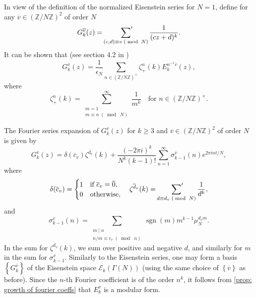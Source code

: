 \documentclass[10pt,leqno,twoside]{article}
\theoremstyle{plain}
\theoremstyle{definition}
\numberwithin{equation}{section}
\numberwithin{lem}{section}
\newcommand{\cbr}[1]{\left\{#1\right\}}
\newcommand{\smod}[1]{\;(\bmod\; #1)}
\DeclareMathOperator{\sgn}{sgn}
\begin{document}
In view of the definition of the normalized Eisenstein series for $N = 1$, define for any $\overline v\in (\mathbb Z/N\mathbb Z)^2$ of order $N$
\[G_k^{\overline v}(z) = \sideset{}{^\prime}\sum_{(c,d)\equiv v\smod N}\frac{1}{(cz+d)^k}.\] It can be shown that (see section 4.2 in \cite{diamond})
\[G_k^{\overline v}(z) = \frac{1}{\epsilon_N}\sum_{n\in(\mathbb Z/N\mathbb Z)^\times}\zeta_+^n(k)E_k^{n^{-1}\overline v}(z),\] where \[\zeta_+^n(k) = \sum_{\substack{m=1\\m\equiv n\smod N}}^\infty \frac{1}{m^k}\quad \text{for $n\in (\mathbb Z/N\mathbb Z)^\times$}.\] 

The Fourier series expansion of $G_k^{\overline v}(z)$ for $k\geq 3$ and $\overline v\in (\mathbb Z/N\mathbb Z)^2$ of order $N$ is given by \[G_k^{\overline v}(z) = \delta(\overline c_v)\zeta^{\overline d_v}(k) + \frac{(-2\pi i)^k}{N^k(k-1)!}\sum_{n=1}^\infty \sigma_{k-1}^{\overline v}(n)e^{2\pi i n t/N},\] where \[\delta(\overline c_v) = \begin{cases}
    1 & \text{if $\overline c_v =\overline 0$},\\
    0 & \text{otherwise},
\end{cases}\quad \zeta^{\overline d_v}(k) = \sideset{}{^\prime}\sum_{d\equiv d_v\smod N}\frac{1}{d^k},\] and 
\[\sigma_{k-1}^{\overline v}(n) = \sum_{\substack{m\mid n\\n/m \equiv c_v\smod n}}\sgn(m)m^{k-1}\mu_N^{d_vm}.\] In the sum for $\zeta^{\overline d_v}(k)$, we sum over positive and negative $d$, and similarly for $m$ in the sum for $\sigma_{k-1}^{\overline v}$. Similarly to the Eisenstein series, one may form a basis $\cbr{G_k^{\overline v}}$ of the Eisenstein space $\mathcal E_k(\varGamma(N))$ (using the same choice of $\cbr{\overline v}$ as before). Since the $n$-th Fourier coefficient is of the order $n^k$, it follows from \cref{prop: growth of fourier coeffs} that $E_k^{\overline v}$ is a modular form.
\end{document}
